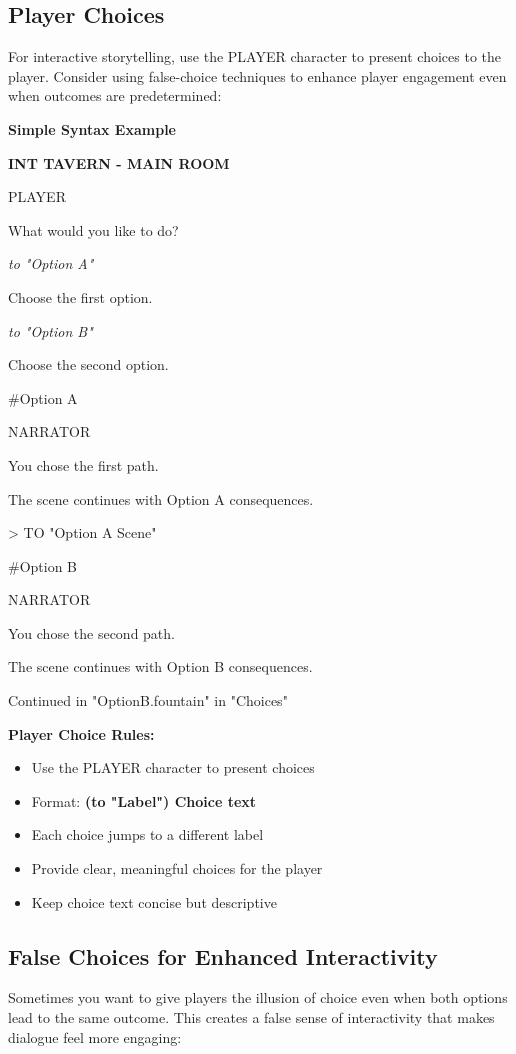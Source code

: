 \documentclass[11pt,letterpaper,oldstylefigures]{memoir}
\newcommand{\slugline}[1]{\nobreak\textbf{\MakeUppercase{#1}}\par\nobreak\vspace{1\baselineskip}}
\newcommand{\speaker}[1]{\nobreak\hspace*{0.333\textwidth}\MakeUppercase{#1}\par\nobreak\vspace{0.5\baselineskip}}
\newcommand{\dialogue}[1]{\nobreak\hspace*{0.25\textwidth}\begin{minipage}{0.5\textwidth}#1\end{minipage}\par\vspace{1\baselineskip}}
\newcommand{\parenthetical}[1]{\nobreak\vspace{0.5\baselineskip}\hspace*{0.292\textwidth}\begin{minipage}{0.416\textwidth}\textit{#1}\end{minipage}\par\vspace{0.5\baselineskip}}
\newcommand{\stagedir}[1]{#1\par\vspace{1\baselineskip}}
\newenvironment{FountainExample}
  {\begingroup
  \ttfamily\small
   \setlength{\parindent}{0pt}
  \setlength{\parskip}{0.5em}
  \allowdisplaybreaks
  \setlength{\displaywidowpenalty}{0}
  \setlength{\widowpenalty}{0}
  \setlength{\clubpenalty}{0}
  \setlength{\interlinepenalty}{0}
}
  {\endgroup}
\newcommand{\sceneendcmd}[1]{\begin{flushright}\ttfamily #1\end{flushright}}
\newenvironment{SimpleExample}
{\begingroup
\small
\setlength{\parindent}{0pt}
\setlength{\parskip}{0.5em}
\allowdisplaybreaks
\setlength{\displaywidowpenalty}{0}
\setlength{\widowpenalty}{0}
\setlength{\clubpenalty}{0}
\setlength{\interlinepenalty}{0}
\begin{tcolorbox}[
    colback=blue!5,
    colframe=blue!75!black,
    boxrule=0.5pt,
    arc=2pt,
    left=0.5em,
    right=0.5em,
    top=0.25em,
    bottom=0.25em
]
\textbf{Simple Syntax Example}
\end{tcolorbox}\par
}
{\endgroup}
\newcommand{\fountain}[1]{\textbf{#1}}
\begin{document}
\subsection{Player Choices}

For interactive storytelling, use the PLAYER character to present choices to the player.
 Consider using \gls{false-choice} techniques to enhance player engagement even when outcomes
 are predetermined:

\begin{SimpleExample}
\begin{FountainExample}
\slugline{INT TAVERN - MAIN ROOM}

\speaker{PLAYER}
\dialogue{What would you like to do?}
\parenthetical{to "Option A"}
\dialogue{Choose the first option.}
\parenthetical{to "Option B"}
\dialogue{Choose the second option.}

\stagedir{\#Option A}
\speaker{NARRATOR}
\dialogue{You chose the first path.}
\stagedir{The scene continues with Option A consequences.}
\sceneendcmd{> TO "Option A Scene"}

\stagedir{\#Option B}
\speaker{NARRATOR}
\dialogue{You chose the second path.}
\stagedir{The scene continues with Option B consequences.}
\sceneendcmd{Continued in "OptionB.fountain" in "Choices"}
\end{FountainExample}
\end{SimpleExample}

\textbf{Player Choice Rules:}
\begin{itemize}
\item Use the PLAYER character to present choices
\item Format: \fountain{(to "Label") Choice text}
\item Each choice jumps to a different label
\item Provide clear, meaningful choices for the player
\item Keep choice text concise but descriptive
\end{itemize}

\subsection{False Choices for Enhanced Interactivity}

Sometimes you want to give players the illusion of choice even when both options lead to the same outcome. This creates a false sense of interactivity that makes dialogue feel more engaging:
\end{document}
